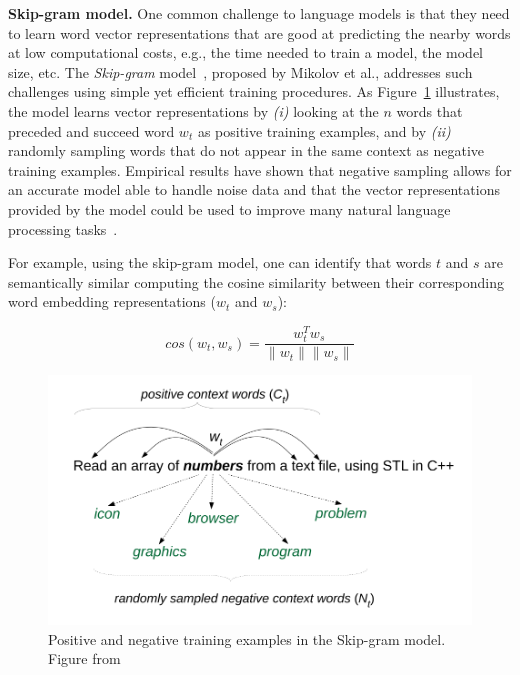 \smallskip
\begin{hangparas}{.0in}{0}
    {\small \textbf{ Skip-gram model.}} One common challenge to language models is that they need to learn word vector representations that are good at predicting the nearby words at low computational costs, e.g., the time needed to train a model, the model size, etc.
    The \textit{Skip-gram} model~\cite{Mikolov2013}, proposed by Mikolov et al., addresses such challenges using simple yet efficient training procedures. As Figure~\ref{fig:skip-gram-example} illustrates, the model learns vector representations by \textit{(i)} looking at the $n$ words that preceded and succeed word $w_t$
     as positive training examples, and by \textit{(ii)} randomly sampling words that do not appear in the same context as negative training examples. Empirical results have shown that negative sampling allows for an accurate model able to handle noise data and that 
     the vector representations provided by the model could be used to improve many natural language processing tasks~\cite{mikolov2013efficient}.
\end{hangparas}


For example, using the skip-gram model, one can identify that words $t$ and $s$ are semantically similar 
computing the cosine similarity between their corresponding word embedding representations ($w_t$ and $w_s$):


\begin{equation}
    cos(w_t,w_s) = \frac{w_t^Tw_s}{\|w_t\| \|w_s\|}
    \label{eq:word-sim}
\end{equation}


\begin{figure}
    \centering
    \includegraphics[width=.65\linewidth]{fig/cp5/ye-skip-gram-example}
    \caption{Positive and negative training examples in the Skip-gram model. Figure from~\cite{Ye2016}}
    \label{fig:skip-gram-example}
\end{figure}



